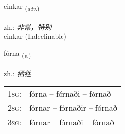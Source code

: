 \documentclass[frontgrid, backgrid]{flacards}\usepackage[]{graphicx}\usepackage[]{xcolor}
\begin{document}

\renewcommand{\flhead}{\vskip5pt \fboxsep=0pt {\small\bfseries\footnotesize Atviksorð | 副词}}
\renewcommand{\fcfoot}{\vskip5pt \fboxsep=0pt \hspace{2pt}{\small\bfseries\footnotesize 3K}}

\renewcommand{\blhead}{\vskip5pt {\small\bfseries\footnotesize Atviksorð | 副词 }}
\renewcommand{\bcfoot}{\vskip5pt \hspace{2pt}{\small\bfseries\footnotesize 3K}}


{einkar \small{\textsubscript{(\textit{adv.})}} \\[1ex]
 \\
zh.: \emph{非常，特别} \\  [2ex]
einkar (Indeclinable)}

\renewcommand{\flhead}{\vskip5pt \fboxsep=0pt {\small\bfseries\footnotesize Sagnorð | 动词}}
\renewcommand{\fcfoot}{\vskip5pt \fboxsep=0pt \hspace{2pt}{\small\bfseries\footnotesize 3K}}

\renewcommand{\blhead}{\vskip5pt {\small\bfseries\footnotesize Sagnorð | 动词 }}
\renewcommand{\bcfoot}{\vskip5pt \hspace{2pt}{\small\bfseries\footnotesize 3K}}


{fórna \small{\textsubscript{(\textit{v.})}} \\[1ex] %
\textphonetic{[fourtna]} \\
zh.: \emph{牺牲} \\  [2ex]
\renewcommand*{\arraystretch}{0.8}
\begin{tabular}{p{1cm}l}
\textsc{1sg}: & fórna -- fórnaði -- fórnað \\ 
\textsc{2sg}: & fórnar -- fórnaðir -- fórnað \\ 
\textsc{3sg}: & fórnar -- fórnaði -- fórnað \\ 
\end{tabular}
}

\renewcommand{\flhead}{\vskip5pt \fboxsep=0pt {\small\bfseries\footnotesize Nafnorð | 名词}}
\renewcommand{\fcfoot}{\vskip5pt \fboxsep=0pt \hspace{2pt}{\small\bfseries\footnotesize 3K}}
\end{document}
